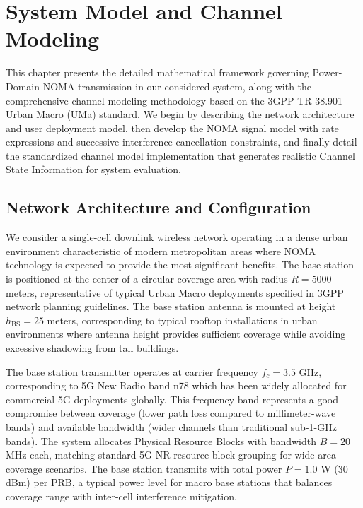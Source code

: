 \chapter{System Model and Channel Modeling}
\label{chap:system_and_channel}

This chapter presents the detailed mathematical framework governing Power-Domain NOMA transmission in our considered system, along with the comprehensive channel modeling methodology based on the 3GPP TR 38.901 Urban Macro (UMa) standard. We begin by describing the network architecture and user deployment model, then develop the NOMA signal model with rate expressions and successive interference cancellation constraints, and finally detail the standardized channel model implementation that generates realistic Channel State Information for system evaluation.

\section{Network Architecture and Configuration}

We consider a single-cell downlink wireless network operating in a dense urban environment characteristic of modern metropolitan areas where NOMA technology is expected to provide the most significant benefits. The base station is positioned at the center of a circular coverage area with radius $R = 5000$ meters, representative of typical Urban Macro deployments specified in 3GPP network planning guidelines. The base station antenna is mounted at height $h_{\text{BS}} = 25$ meters, corresponding to typical rooftop installations in urban environments where antenna height provides sufficient coverage while avoiding excessive shadowing from tall buildings.

The base station transmitter operates at carrier frequency $f_c = 3.5$ GHz, corresponding to 5G New Radio band n78 which has been widely allocated for commercial 5G deployments globally. This frequency band represents a good compromise between coverage (lower path loss compared to millimeter-wave bands) and available bandwidth (wider channels than traditional sub-1-GHz bands). The system allocates Physical Resource Blocks with bandwidth $B = 20$ MHz each, matching standard 5G NR resource block grouping for wide-area coverage scenarios. The base station transmits with total power $P = 1.0$ W (30 dBm) per PRB, a typical power level for macro base stations that balances coverage range with inter-cell interference mitigation.


